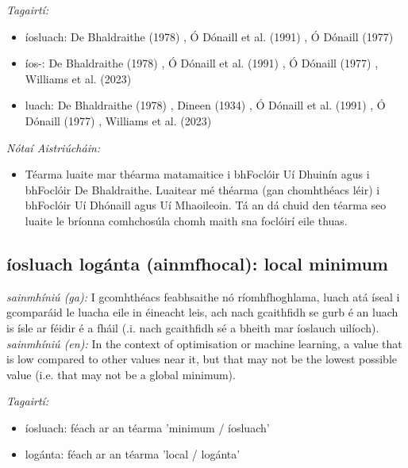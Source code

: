 \documentclass{article}
\begin{document}
 \noindent \textit{Tagairtí:}
\begin{itemize}
	\item íosluach: De Bhaldraithe (1978) \cite{de-bhaldraithe}, Ó Dónaill et al. (1991) \cite{focloir-beag}, Ó Dónaill (1977) \cite{odonaill}
	\item íos-: De Bhaldraithe (1978) \cite{de-bhaldraithe}, Ó Dónaill et al. (1991) \cite{focloir-beag}, Ó Dónaill (1977) \cite{odonaill}, Williams et al. (2023) \cite{storchiste}
	\item luach: De Bhaldraithe (1978) \cite{de-bhaldraithe}, Dineen (1934) \cite{dineen}, Ó Dónaill et al. (1991) \cite{focloir-beag}, Ó Dónaill (1977) \cite{odonaill}, Williams et al. (2023) \cite{storchiste}
\end{itemize}

 \noindent \textit{Nótaí Aistriúcháin:}
\begin{itemize}
	\item Téarma luaite mar théarma matamaitice i bhFoclóir Uí Dhuinín agus i bhFoclóir De Bhaldraithe. Luaitear mé théarma (gan chomhthéacs léir) i bhFoclóir Uí Dhónaill agus Uí Mhaoileoin. Tá an dá chuid den téarma seo luaite le bríonna comhchosúla chomh maith sna foclóirí eile thuas.
\end{itemize}


\subsection*{íosluach logánta (ainmfhocal): local minimum} 
 \noindent \textit{sainmhíniú (ga):} I gcomhthéacs feabhsaithe nó ríomhfhoghlama, luach atá íseal i gcomparáid le luacha eile in éineacht leis, ach nach gcaithfidh se gurb é an luach is ísle ar féidir é a fháil (.i. nach gcaithfidh sé a bheith mar íoslauch uilíoch).
\newline\newline
 \noindent \textit{sainmhíniú (en):} In the context of optimisation or machine learning, a value that is low compared to other values near it, but that may not be the lowest possible value (i.e. that may not be a global minimum).
\newline

 \noindent \textit{Tagairtí:}
\begin{itemize}
	\item íosluach: féach ar an téarma 'minimum / íosluach'
	\item logánta: féach ar an téarma 'local / logánta'
\end{itemize}
\end{document}
